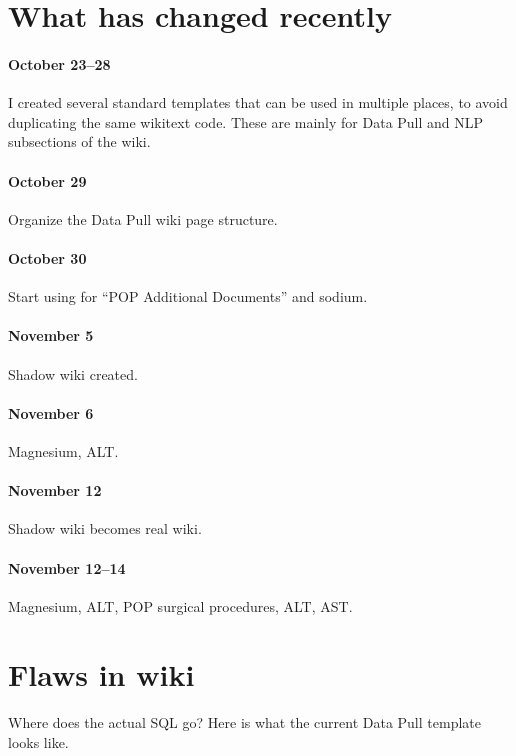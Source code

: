 \documentclass{tufte-handout}
\begin{document}

\section{What has changed recently}

\paragraph{October 23--28} I created several standard templates that
can be used in multiple places, to avoid duplicating the same wikitext
code. These are mainly for Data Pull and NLP subsections of the wiki. 

\paragraph{October 29} Organize the Data Pull wiki page structure. 

\paragraph{October 30} Start using for ``POP Additional Documents''
and sodium.

\paragraph{November 5} Shadow wiki created.

\paragraph{November 6} Magnesium, ALT.

\paragraph{November 12} Shadow wiki becomes real wiki.

\paragraph{November 12--14} Magnesium, ALT, POP surgical procedures,
ALT, AST.

\section{Flaws in wiki}

Where does the actual SQL go? Here is what the current Data Pull
template looks like.
\end{document}
